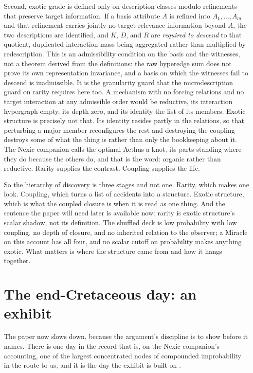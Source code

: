 Second, exotic grade is defined only on description classes modulo
refinements that preserve target information. If a basis attribute $A$
is refined into $A_1,\dots,A_m$ and that refinement carries jointly no
target-relevance information beyond $A$, the two descriptions are
identified, and $K$, $D$, and $R$ are \emph{required to descend} to
that quotient, duplicated interaction mass being aggregated rather
than multiplied by redescription. This is an admissibility condition
on the basis and the witnesses, not a theorem derived from the
definitions: the raw hyperedge sum does not prove its own representation
invariance, and a basis on which the witnesses fail to descend is
inadmissible. It is the granularity guard that the microdescription
guard on rarity requires here too. A mechanism with no forcing
relations and no target interaction at any admissible order would be
reductive, its interaction hypergraph empty, its depth zero, and its
identity the list of its members. Exotic structure is precisely not
that. Its identity resides partly in the relations, so that perturbing a
major member reconfigures the rest and destroying the coupling destroys
some of what the thing is rather than only the bookkeeping about it.
The Nexic companion calls the optimal Aethus a knot, its parts standing
where they do because the others do, and that is the word: organic
rather than reductive. Rarity supplies the contrast. Coupling supplies the life.

So the hierarchy of discovery is three stages and not one. Rarity, which
makes one look. Coupling, which turns a list of accidents into a
structure. Exotic structure, which is what the coupled closure is when
it is read as one thing. And the sentence the paper will need later is
available now: rarity is exotic structure's scalar shadow, not its
definition. The shuffled deck is low probability with low coupling, no
depth of closure, and no inherited relation to the observer; a Miracle
on this account has all four, and no scalar cutoff on probability makes
anything exotic. What matters is where the structure came from and how
it hangs together.

\section{The end-Cretaceous day: an exhibit}\label{sec:kpg}

The paper now slows down, because the argument's discipline is to show
before it names. There is one day in the record that is, on the Nexic companion's
accounting, one of the largest concentrated nodes of compounded
improbability in the route to us, and it is the day the exhibit is
built on \cite{Nexus}.

